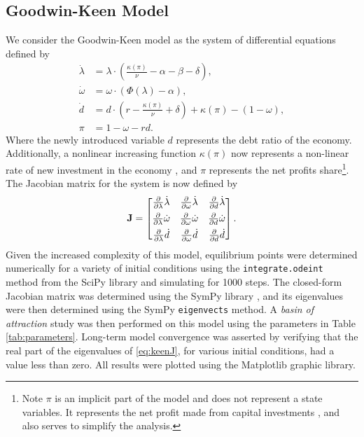 \documentclass[12pt, centerh1]{article}
\begin{document}
\subsection{Goodwin-Keen Model}
We consider the Goodwin-Keen model as the system of differential equations defined by 
\begin{equation} \label{eq:keen}
\begin{split}
    \dot{\lambda} &= \lambda \cdot \left( \frac{\kappa(\pi)}{\nu} - \alpha - \beta - \delta \right),\\
    \dot{\omega} &= \omega \cdot (\Phi(\lambda) - \alpha),\\
    \dot{d} &= d\cdot\left(r-\frac{\kappa(\pi)}{\nu}+\delta\right)+\kappa(\pi)-(1-\omega), \\
    \pi &= 1-\omega-rd.
\end{split}
\end{equation}
Where the newly introduced variable $d$ represents the debt ratio of the economy. Additionally, a nonlinear increasing function $\kappa(\pi)$ now represents a non-linear rate of new investment in the economy \citep{grasselli2012analysis}, and $\pi$ represents the net profits share\footnote{Note $\pi$ is an implicit part of the model and does not represent a state variables. It represents the net profit made from capital investments \citep{grasselli2012analysis}, and also serves to simplify the analysis.}. The Jacobian matrix for the system is now defined by 
\begin{equation} \label{eq:keenJ}
\mathbf J =
\begin{bmatrix}
    \pdv{\lambda}\dot{\lambda} & \pdv{\omega}\dot{\lambda} & \pdv{d}\dot{\lambda}\\[1ex]
    \pdv{\lambda}\dot{\omega} & \pdv{\omega}\dot{\omega} & \pdv{d}\dot{\omega}\\[1ex]
    \pdv{\lambda}\dot{d} & \pdv{\omega}\dot{d} & \pdv{d}\dot{d}
\end{bmatrix}.
\end{equation}
Given the increased complexity of this model, equilibrium points were determined numerically for a variety of initial conditions using the \texttt{integrate.odeint} method from the SciPy library \citep{2020SciPy-NMeth} and simulating for 1000 steps. The closed-form Jacobian matrix was determined using the SymPy library \citep{SymPy}, and its eigenvalues were then determined using the SymPy \texttt{eigenvects} method. A \emph{basin of attraction} study was then performed on this model using the parameters in Table \ref{tab:parameters}. Long-term model convergence was asserted by verifying that the real part of the eigenvalues of \eqref{eq:keenJ}, for various initial conditions, had a value less than zero. All results were plotted using the Matplotlib \citep{matplotlib} graphic library.
\end{document}

